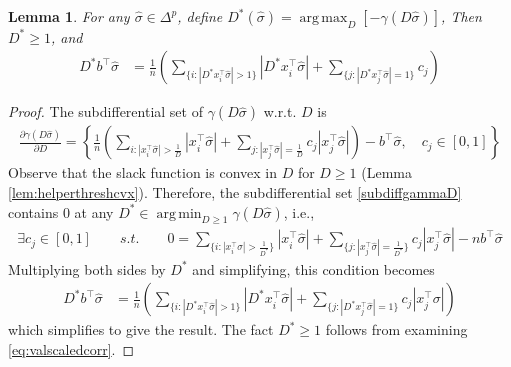 \documentclass{colt2015} %
\newtheorem{lem}[thm]{Lemma}
\DeclareMathOperator*{\argmin}{arg\,min}
\DeclareMathOperator*{\argmax}{arg\,max}
\newcommand{\abs}[1]{\left| #1 \right|}
\newcommand{\sighat}{\hat{\sigma}}
\newcommand{\lrp}[1]{\left(#1\right)}
\begin{document}
\begin{lem}
\label{lem:partsolvegame}
For any $\sighat \in \Delta^p$, 
define $D^*(\sighat) = \argmax_{D} [- \gamma(D \sighat) ]$, 
Then $D^* \geq 1$, and 
\begin{align*}
D^* b^\top \sighat &= \frac{1}{n} \lrp{ \sum_{\{i : \abs{D^* x_{i}^\top \sighat} > 1 \}} \abs{D^* x_{i}^\top \sighat} 
+ \sum_{\{j : \abs{D^* x_{j}^\top \sighat} = 1 \}} c_j }
\end{align*}
\end{lem}
\begin{proof}
The subdifferential set of $\gamma (D \sighat)$ w.r.t. $D$ is
\begin{align}
\label{subdiffgammaD}
\frac{\partial \gamma (D \sighat)}{\partial D} 
= \left\{ \frac{1}{n} \lrp{ \sum_{i : \abs{x_{i}^\top \sighat} > \frac{1}{D}} \abs{x_{i}^\top \sighat}  
+ \sum_{j : \abs{x_{j}^\top \sighat} = \frac{1}{D}} c_j \abs{x_{j}^\top \sighat} } - b^\top \sighat , \quad c_j \in [0,1]  \right\}
\end{align}
Observe that the slack function is convex in $D$ for $D \geq 1$ (Lemma \ref{lem:helperthreshcvx}).
Therefore, the subdifferential set \eqref{subdiffgammaD} contains $0$ at any $D^* \in \argmin_{D \geq 1} \gamma (D \sighat)$, 
i.e.,
\begin{align}
\label{gammasgexact}
\exists c_j \in [0,1] \qquad s.t. \qquad 
0 = \sum_{\{i : \abs{x_{i}^\top \sighat} > \frac{1}{D^*} \}} \abs{x_{i}^\top \sighat} 
+ \sum_{\{j : \abs{x_{j}^\top \sighat} = \frac{1}{D^*} \}} c_j \abs{x_{j}^\top \sighat} - n b^\top \sighat
\end{align}
Multiplying both sides by $D^*$ and simplifying, 
this condition becomes 
\begin{align}
\label{eq:valscaledcorr}
D^* b^\top \sighat &= \frac{1}{n} \lrp{ \sum_{\{i : \abs{D^* x_{i}^\top \sighat} > 1 \}} \abs{D^* x_{i}^\top \sighat} 
+ \sum_{\{j : \abs{D^* x_{j}^\top \sighat} = 1 \}} c_j \abs{x_{j}^\top \sigma} }
\end{align}
which simplifies to give the result. 
The fact $D^* \geq 1$ follows from examining \eqref{eq:valscaledcorr}.
\end{proof}

\fi
\end{document}
